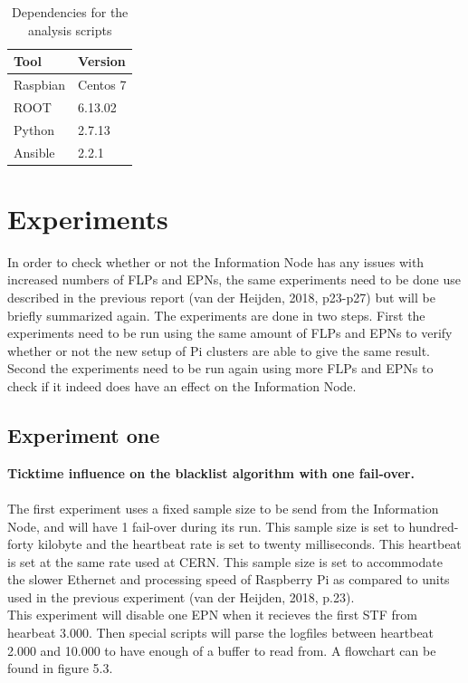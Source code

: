 \begin{table}[ht]
\begin{tabular}{| l | l |}
\hline
Tool & Version \\ \hline
Raspbian & Centos 7 \\ \hline
ROOT & 6.13.02 \\ \hline
Python & 2.7.13 \\ \hline
Ansible & 2.2.1 \\ \hline
\end{tabular}
\caption{Dependencies for the analysis scripts}
\end{table}

\newpage

\section{Experiments}
In order to check whether or not the Information Node has any issues with increased numbers of FLPs and EPNs, the same experiments need to be done use described in the previous report (van der Heijden, 2018, p23-p27) but will be briefly summarized again. The experiments are done in two steps. First the experiments need to be run using the same amount of FLPs and EPNs to verify whether or not the new setup of Pi clusters are able to give the same result. Second the experiments need to be run again using more FLPs and EPNs to check if it indeed does have an effect on the Information Node.

\subsection{Experiment one}
\textbf{Ticktime influence on the blacklist algorithm with one fail-over.}
\\\\
The first experiment uses a fixed sample size to be send from the Information Node, and will have 1 fail-over during its run. This sample size is set to hundred-forty kilobyte and 
the heartbeat rate is set to twenty milliseconds. This heartbeat is set at the same rate used at CERN. This sample size is set to accommodate the slower Ethernet and processing speed of Raspberry Pi as compared to units used in the previous experiment (van der Heijden, 2018, p.23). \\
This experiment will disable one EPN when it recieves the first STF from hearbeat 3.000. Then special scripts will parse the logfiles between heartbeat 2.000 and 10.000 to have enough of a buffer to read from. A flowchart can be found in figure 5.3.

